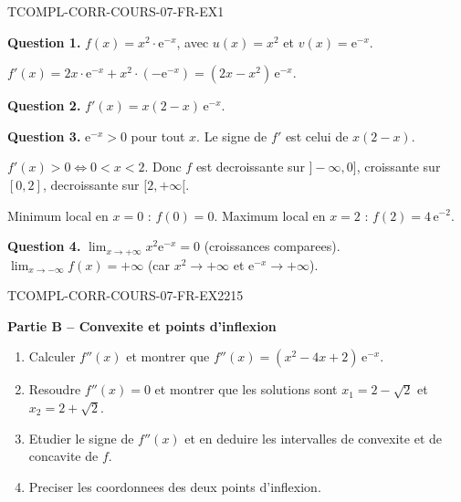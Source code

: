 \begin{corrige}{TCOMPL-CORR-COURS-07-FR-EX1}

\textbf{Question 1.} $f(x) = x^2 \cdot \mathrm{e}^{-x}$, avec $u(x) = x^2$ et $v(x) = \mathrm{e}^{-x}$.

$f'(x) = 2x \cdot \mathrm{e}^{-x} + x^2 \cdot (-\mathrm{e}^{-x}) = (2x - x^2)\,\mathrm{e}^{-x}$.

\textbf{Question 2.} $f'(x) = x(2-x)\,\mathrm{e}^{-x}$.

\textbf{Question 3.} $\mathrm{e}^{-x} > 0$ pour tout $x$. Le signe de $f'$ est celui de $x(2-x)$.

$f'(x) > 0 \iff 0 < x < 2$. Donc $f$ est decroissante sur $]-\infty, 0]$, croissante sur $[0, 2]$, decroissante sur $[2, +\infty[$.

Minimum local en $x = 0$ : $f(0) = 0$. Maximum local en $x = 2$ : $f(2) = 4\,\mathrm{e}^{-2}$.

\textbf{Question 4.} $\lim_{x \to +\infty} x^2 \mathrm{e}^{-x} = 0$ (croissances comparees). $\lim_{x \to -\infty} f(x) = +\infty$ (car $x^2 \to +\infty$ et $\mathrm{e}^{-x} \to +\infty$).

\end{corrige}

\bigskip


\begin{exercice}{TCOMPL-CORR-COURS-07-FR-EX2}{2}{15}

\textbf{Partie B -- Convexite et points d'inflexion}

\begin{enumerate}
  \item Calculer $f''(x)$ et montrer que $f''(x) = (x^2 - 4x + 2)\,\mathrm{e}^{-x}$.
  \item Resoudre $f''(x) = 0$ et montrer que les solutions sont $x_1 = 2 - \sqrt{2}$ et $x_2 = 2 + \sqrt{2}$.
  \item Etudier le signe de $f''(x)$ et en deduire les intervalles de convexite et de concavite de $f$.
  \item Preciser les coordonnees des deux points d'inflexion.
\end{enumerate}

\end{exercice}

